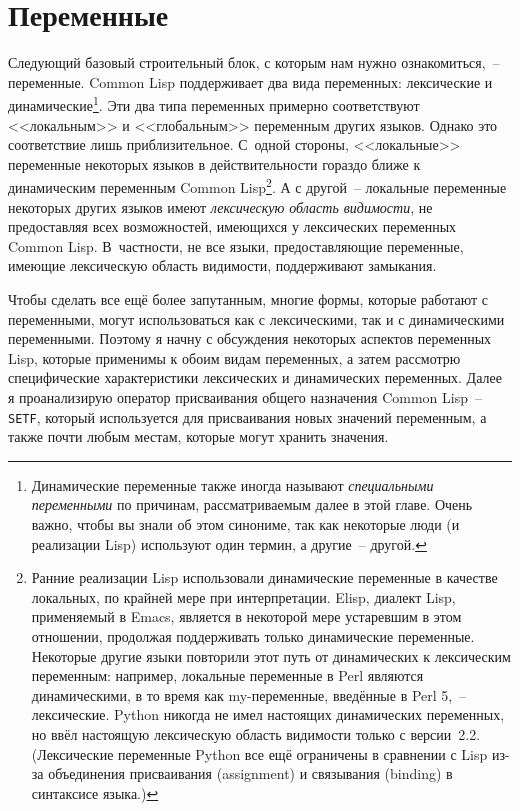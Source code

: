 \chapter{Переменные}
\label{ch:06}

\thispagestyle{empty}

Следующий базовый строительный блок, с которым нам нужно ознакомиться,~--
переменные. Common Lisp поддерживает два вида переменных: лексические и
динамические\footnote{Динамические переменные также иногда называют \textit{специальными
    переменными} по причинам, рассматриваемым далее в этой главе. Очень важно, чтобы вы
  знали об этом синониме, так как некоторые люди (и реализации Lisp) используют один
  термин, а другие~-- другой.}. Эти два типа переменных примерно соответствуют
<<локальным>> и <<глобальным>> переменным других языков. Однако это соответствие лишь
приблизительное. С~одной стороны, <<локальные>> переменные некоторых языков в
действительности гораздо ближе к динамическим переменным Common Lisp\footnote{Ранние
  реализации Lisp использовали динамические переменные в качестве локальных, по крайней
  мере при интерпретации. Elisp, диалект Lisp, применяемый в Emacs, является в некоторой
  мере устаревшим в этом отношении, продолжая поддерживать только динамические
  переменные. Некоторые другие языки повторили этот путь от динамических к лексическим
  переменным: например, локальные переменные в Perl являются динамическими, в то время как
  my-переменные, введённые в Perl 5,~-- лексические. Python никогда не имел настоящих
  динамических переменных, но ввёл настоящую лексическую область видимости только с
  версии~2.2. (Лексические переменные Python все ещё ограничены в сравнении с Lisp из-за
  объединения присваивания (assignment) и связывания (binding) в синтаксисе языка.)}. А с
другой~-- локальные переменные некоторых других языков имеют \textit{лексическую область
  видимости}, не предоставляя всех возможностей, имеющихся у лексических переменных
Common Lisp. В~частности, не все языки, предоставляющие переменные, имеющие лексическую
область видимости, поддерживают замыкания.

Чтобы сделать все ещё более запутанным, многие формы, которые работают с переменными,
могут использоваться как с лексическими, так и с динамическими переменными. Поэтому я
начну с обсуждения некоторых аспектов переменных Lisp, которые применимы к обоим видам
переменных, а затем рассмотрю специфические харак\-те\-рис\-ти\-ки лексических и динамических
переменных. Далее я проанализирую оператор присваивания общего назначения Common Lisp~--
\lstinline{SETF}, который используется для присваивания новых значений переменным, а также
почти любым местам, которые могут хранить значения.

